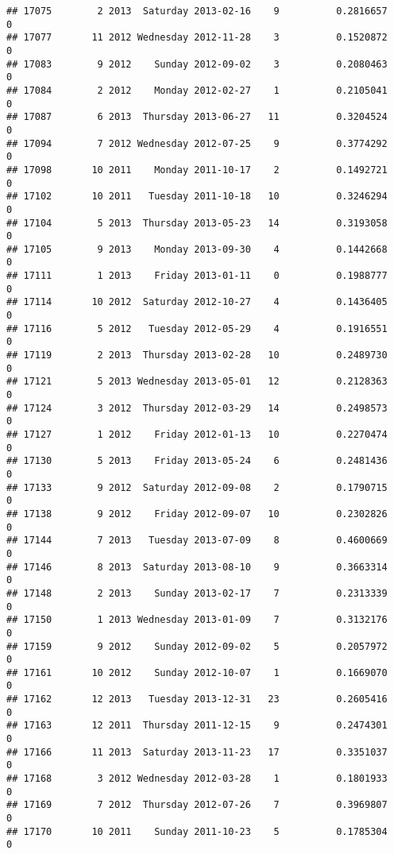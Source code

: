 \documentclass[
]{article}
\begin{document}
\begin{verbatim}
## 17075        2 2013  Saturday 2013-02-16    9          0.2816657             0
## 17077       11 2012 Wednesday 2012-11-28    3          0.1520872             0
## 17083        9 2012    Sunday 2012-09-02    3          0.2080463             0
## 17084        2 2012    Monday 2012-02-27    1          0.2105041             0
## 17087        6 2013  Thursday 2013-06-27   11          0.3204524             0
## 17094        7 2012 Wednesday 2012-07-25    9          0.3774292             0
## 17098       10 2011    Monday 2011-10-17    2          0.1492721             0
## 17102       10 2011   Tuesday 2011-10-18   10          0.3246294             0
## 17104        5 2013  Thursday 2013-05-23   14          0.3193058             0
## 17105        9 2013    Monday 2013-09-30    4          0.1442668             0
## 17111        1 2013    Friday 2013-01-11    0          0.1988777             0
## 17114       10 2012  Saturday 2012-10-27    4          0.1436405             0
## 17116        5 2012   Tuesday 2012-05-29    4          0.1916551             0
## 17119        2 2013  Thursday 2013-02-28   10          0.2489730             0
## 17121        5 2013 Wednesday 2013-05-01   12          0.2128363             0
## 17124        3 2012  Thursday 2012-03-29   14          0.2498573             0
## 17127        1 2012    Friday 2012-01-13   10          0.2270474             0
## 17130        5 2013    Friday 2013-05-24    6          0.2481436             0
## 17133        9 2012  Saturday 2012-09-08    2          0.1790715             0
## 17138        9 2012    Friday 2012-09-07   10          0.2302826             0
## 17144        7 2013   Tuesday 2013-07-09    8          0.4600669             0
## 17146        8 2013  Saturday 2013-08-10    9          0.3663314             0
## 17148        2 2013    Sunday 2013-02-17    7          0.2313339             0
## 17150        1 2013 Wednesday 2013-01-09    7          0.3132176             0
## 17159        9 2012    Sunday 2012-09-02    5          0.2057972             0
## 17161       10 2012    Sunday 2012-10-07    1          0.1669070             0
## 17162       12 2013   Tuesday 2013-12-31   23          0.2605416             0
## 17163       12 2011  Thursday 2011-12-15    9          0.2474301             0
## 17166       11 2013  Saturday 2013-11-23   17          0.3351037             0
## 17168        3 2012 Wednesday 2012-03-28    1          0.1801933             0
## 17169        7 2012  Thursday 2012-07-26    7          0.3969807             0
## 17170       10 2011    Sunday 2011-10-23    5          0.1785304             0

\end{verbatim}
\end{document}

